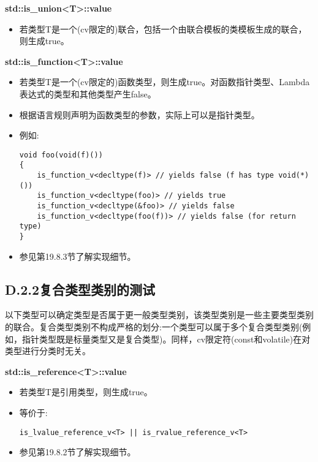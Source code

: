 \textbf{std::is\_union<T>::value}

\begin{itemize}
\item 
若类型T是一个(cv限定的)联合，包括一个由联合模板的类模板生成的联合，则生成true。
\end{itemize}

\textbf{std::is\_function<T>::value}

\begin{itemize}
\item 
若类型T是一个(cv限定的)函数类型，则生成true。对函数指针类型、Lambda表达式的类型和其他类型产生false。

\item 
根据语言规则声明为函数类型的参数，实际上可以是指针类型。

\item 
例如:
\begin{lstlisting}[style=styleCXX]
void foo(void(f)())
{
	is_function_v<decltype(f)> // yields false (f has type void(*)())
	is_function_v<decltype(foo)> // yields true
	is_function_v<decltype(&foo)> // yields false
	is_function_v<decltype(foo(f))> // yields false (for return type)
}
\end{lstlisting}

\item 
参见第19.8.3节了解实现细节。
\end{itemize}

\subsection{D.2.2\hspace{0.2cm}复合类型类别的测试}

以下类型可以确定类型是否属于更一般类型类别，该类型类别是一些主要类型类别的联合。复合类型类别不构成严格的划分:一个类型可以属于多个复合类型类别(例如，指针类型既是标量类型又是复合类型)。同样，cv限定符(const和volatile)在对类型进行分类时无关。

\textbf{std::is\_reference<T>::value}

\begin{itemize}
\item 
若类型T是引用类型，则生成true。

\item 
等价于: 
\begin{lstlisting}[style=styleCXX]
is_lvalue_reference_v<T> || is_rvalue_reference_v<T>
\end{lstlisting}

\item 
参见第19.8.2节了解实现细节。
\end{itemize}


